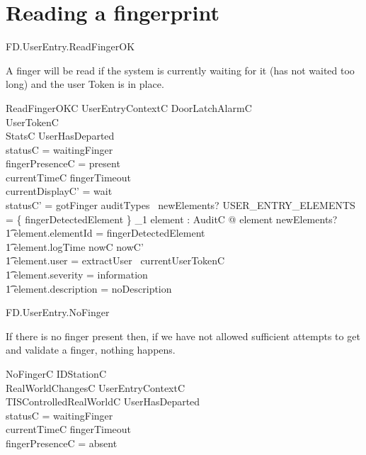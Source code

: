 \section{Reading a fingerprint}

\begin{traceunit}{FD.UserEntry.ReadFingerOK}
\end{traceunit}


A finger will be read if the system is currently waiting for it (has
not waited too long) and
the user Token is in place.

\begin{schema}{ReadFingerOKC}
        UserEntryContextC
\also
        \Xi DoorLatchAlarmC
\\	\Xi UserTokenC
\\      \Xi StatsC
\where
        \lnot UserHasDeparted
\\	statusC = waitingFinger
\\	fingerPresenceC = present
\\      currentTimeC \leq fingerTimeout 
\also
\\	currentDisplayC' = wait
\\	statusC' = gotFinger
\also
        auditTypes~ newElements? \cap USER\_ENTRY\_ELEMENTS = 
        \{ fingerDetectedElement \} 
\also
        \exists_1 element : AuditC @ element \in newElements? 
\\ \t1  \land element.elementId = fingerDetectedElement
\\ \t1  \land element.logTime \in nowC \upto nowC'
\\ \t1  \land element.user = extractUser~ currentUserTokenC
\\ \t1  \land element.severity = information
\\ \t1  \land element.description = noDescription
\end{schema}


\begin{traceunit}{FD.UserEntry.NoFinger}
\end{traceunit}


If there is no finger present then, if we have not allowed sufficient
attempts to get and validate a finger, nothing happens. 

\begin{schema}{NoFingerC}
        \Xi IDStationC
\\      RealWorldChangesC
\also
        UserEntryContextC
\\      \Xi TISControlledRealWorldC
\where
        \lnot UserHasDeparted
\\      statusC = waitingFinger
\\      currentTimeC \leq fingerTimeout 
\\      fingerPresenceC = absent
\end{schema}

